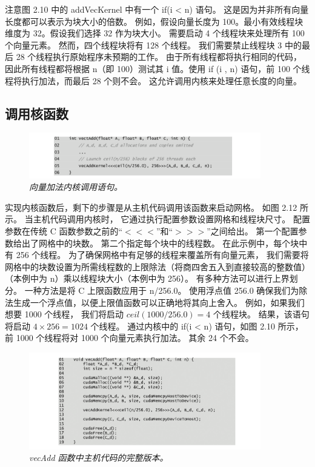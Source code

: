 注意图 2.10 中的 addVecKernel 中有一个 if(i < n) 语句。 这是因为并非所有向量长度都可以表示为块大小的倍数。 
例如，假设向量长度为 100。最小有效线程块维度为 32。假设我们选择 32 作为块大小。 
需要启动 4 个线程块来处理所有 100 个向量元素。 然而，四个线程块将有 128 个线程。 
我们需要禁止线程块 3 中的最后 28 个线程执行原始程序未预期的工作。 由于所有线程都将执行相同的代码，
因此所有线程都将根据 n（即 100）测试其 i 值。使用 if (i , n) 语句，前 100 个线程将执行加法，而最后 28 个则不会。 
这允许调用内核来处理任意长度的向量。

\subsection{调用核函数}
\begin{figure}[H]
	\centering
	\includegraphics[width=0.9\textwidth]{figs/F2.12.png}
	\caption{\textit{向量加法内核调用语句。}}
\end{figure}

实现内核函数后，剩下的步骤是从主机代码调用该函数来启动网格。 如图 2.12 所示。 当主机代码调用内核时，
它通过执行配置参数设置网格和线程块尺寸。 配置参数在传统 C 函数参数之前的“$<<<$”和“$>>>$”之间给出。 
第一个配置参数给出了网格中的块数。 第二个指定每个块中的线程数。 在此示例中，每个块中有 256 个线程。 
为了确保网格中有足够的线程来覆盖所有向量元素，
我们需要将网格中的块数设置为所需线程数的上限除法（将商四舍五入到直接较高的整数值） 
（本例中为 n）乘以线程块大小（本例中为 256）。 有多种方法可以进行上界划分。 一种方法是将 C 上限函数应用于 n/256.0。 
使用浮点值 256.0 确保我们为除法生成一个浮点值，以便上限值函数可以正确地将其向上舍入。 例如，如果我们想要 1000 个线程，
我们将启动 $ceil(1000/256.0) = 4$ 个线程块。 结果，该语句将启动 $4 \times 256 = 1024$ 个线程。 
通过内核中的 if(i < n) 语句，如图 2.10 所示，前 1000 个线程将对 1000 个向量元素执行加法。 其余 24 个不会。

\begin{figure}[H]
	\centering
	\includegraphics[width=0.9\textwidth]{figs/F2.13.png}
	\caption{\textit{vecAdd 函数中主机代码的完整版本。}}
\end{figure}

